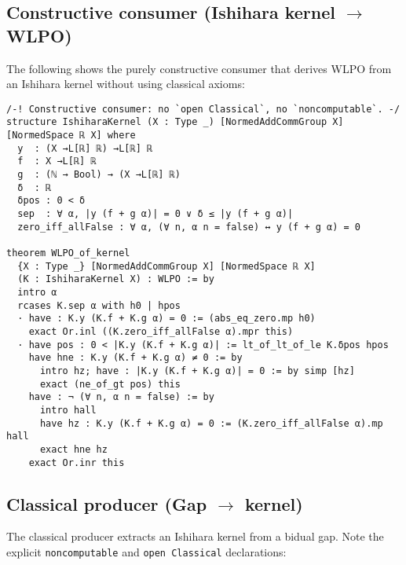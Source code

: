 \documentclass[11pt]{article}
\begin{document}
\subsection{Constructive consumer (Ishihara kernel $\to$ WLPO)}

The following shows the purely constructive consumer that derives WLPO from an Ishihara kernel without using classical axioms:

\begin{lstlisting}[caption={Constructive consumer: no classical axioms},label={lst:consumer}]
/-! Constructive consumer: no `open Classical`, no `noncomputable`. -/
structure IshiharaKernel (X : Type _) [NormedAddCommGroup X] [NormedSpace ℝ X] where
  y  : (X →L[ℝ] ℝ) →L[ℝ] ℝ
  f  : X →L[ℝ] ℝ
  g  : (ℕ → Bool) → (X →L[ℝ] ℝ)
  δ  : ℝ
  δpos : 0 < δ
  sep  : ∀ α, |y (f + g α)| = 0 ∨ δ ≤ |y (f + g α)|
  zero_iff_allFalse : ∀ α, (∀ n, α n = false) ↔ y (f + g α) = 0

theorem WLPO_of_kernel
  {X : Type _} [NormedAddCommGroup X] [NormedSpace ℝ X]
  (K : IshiharaKernel X) : WLPO := by
  intro α
  rcases K.sep α with h0 | hpos
  · have : K.y (K.f + K.g α) = 0 := (abs_eq_zero.mp h0)
    exact Or.inl ((K.zero_iff_allFalse α).mpr this)
  · have pos : 0 < |K.y (K.f + K.g α)| := lt_of_lt_of_le K.δpos hpos
    have hne : K.y (K.f + K.g α) ≠ 0 := by
      intro hz; have : |K.y (K.f + K.g α)| = 0 := by simp [hz]
      exact (ne_of_gt pos) this
    have : ¬ (∀ n, α n = false) := by
      intro hall
      have hz : K.y (K.f + K.g α) = 0 := (K.zero_iff_allFalse α).mp hall
      exact hne hz
    exact Or.inr this
\end{lstlisting}

\subsection{Classical producer (Gap $\to$ kernel)}

The classical producer extracts an Ishihara kernel from a bidual gap. Note the explicit \texttt{noncomputable} and \texttt{open Classical} declarations:
\end{document}
